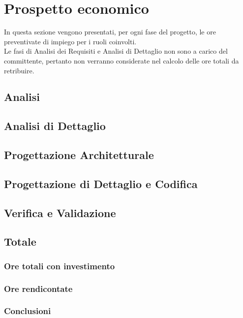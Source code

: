 \section{Prospetto economico}
	In questa sezione vengono presentati, per ogni fase del progetto, le ore preventivate di impiego per i ruoli coinvolti. \\
	Le fasi di Analisi dei Requisiti e Analisi di Dettaglio non sono a carico del committente, pertanto non verranno considerate nel calcolo delle ore totali da retribuire.
\subsection{Analisi}
\subsection{Analisi di Dettaglio}
\subsection{Progettazione Architetturale}
\subsection{Progettazione di Dettaglio e Codifica}
\subsection{Verifica e Validazione}
\subsection{Totale}
\subsubsection{Ore totali con investimento}
\subsubsection{Ore rendicontate}
\subsubsection{Conclusioni}